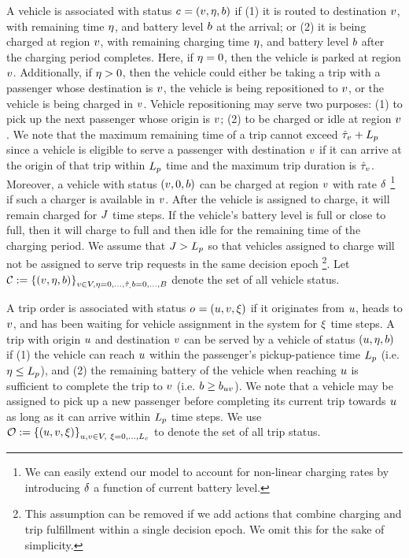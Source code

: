 A vehicle is associated with status $c_{}= (v, \eta, b)$ if (1) it is routed to destination $v$, with remaining time $\eta$, and battery level $b$ at the arrival; or (2) it is being charged at region $v$, with remaining charging time $\eta$, and battery level $b$ after the charging period completes. Here, if $\eta=0$, then the vehicle is parked at region $v$. Additionally, if $\eta>0$, then the vehicle could either be taking a trip with a passenger whose destination is $v$, the vehicle is being repositioned to $v$, or the vehicle is being charged in $v$. Vehicle repositioning may serve two purposes: (1) to pick up the next passenger whose origin is $v$; (2) to be charged or idle at region $v$. We note that the maximum remaining time of a trip cannot exceed $\hat{\tau}_{v} + L_p$ since a vehicle is eligible to serve a passenger with destination $v$ if it can arrive at the origin of that trip within $L_p$ time and the maximum trip duration is $\hat{\tau}_{v}$. Moreover, a vehicle with status $(v, 0, b)$ can be charged at region $v$ with rate $\delta$ \footnote{We can easily extend our model to account for non-linear charging rates by introducing $\delta$ a function of current battery level.} if such a charger is available in $v$. After the vehicle is assigned to charge, it will remain charged for $J$ time steps. If the vehicle's battery level is full or close to full, then it will charge to full and then idle for the remaining time of the charging period. We assume that $J > L_p$ so that vehicles assigned to charge will not be assigned to serve trip requests in the same decision epoch \footnote{This assumption can be removed if we add actions that combine charging and trip fulfillment within a single decision epoch. We omit this for the sake of simplicity.}. Let $\mathcal{C} := \left\{(v, \eta, b) \right\}_{v \in V, \eta = 0, \dots, \hat{\tau}_{,} b = 0, \dots, B}$ denote the set of all vehicle status.
 

A trip order is associated with status $o_{}= (u, v, \xi)$ if it originates from $u$, heads to $v$, and has been waiting for vehicle assignment in the system for $\xi$ time steps. A trip with origin $u$ and destination $v$ can be served by a vehicle of status $(u, \eta, b)$ if (1) the vehicle can reach $u$ within the passenger's pickup-patience time $L_p$ (i.e. $\eta \leq L_p$), and (2) the remaining battery of the vehicle when reaching $u$ is sufficient to complete the trip to $v$ (i.e. $b \geq b_{uv}$). We note that a vehicle may be assigned to pick up a new passenger before completing its current trip towards $u$ as long as it can arrive within $L_p$ time steps. We use $\mathcal{O} := \left\{(u, v, \xi) \right\}_{u, v\in V,\ \xi = 0, \dots, L_c}$ to denote the set of all trip status. 

